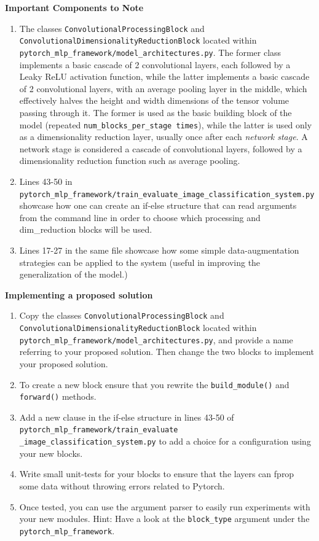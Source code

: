 \documentclass[11pt,]{article}
\begin{document}
\textbf{Important Components to Note}

\begin{enumerate}
    \item The classes \texttt{ConvolutionalProcessingBlock} and \texttt{ConvolutionalDimensionalityReductionBlock} located within \texttt{pytorch\_mlp\_framework/model\_architectures.py}. The former class implements a basic cascade of 2 convolutional layers, each followed by a Leaky ReLU activation function, while the latter implements a basic cascade of 2 convolutional layers, with an average pooling layer in the middle, which effectively halves the height and width dimensions of the tensor volume passing through it. The former is used as the basic building block of the model (repeated \texttt{num\_blocks\_per\_stage times}), while the latter is used only as a dimensionality reduction layer, usually once after each \emph{network stage}. A network stage is considered a cascade of convolutional layers, followed by a dimensionality reduction function such as average pooling. 
    \item Lines 43-50 in \texttt{pytorch\_mlp\_framework/train\_evaluate\_image\_classification\_system.py} showcase how one can create an if-else structure that can read arguments from the command line in order to choose which processing and dim\_reduction blocks will be used.
    \item Lines 17-27 in the same file showcase how some simple data-augmentation strategies can be applied to the system (useful in improving the generalization of the model.)
     
\end{enumerate}

\textbf{Implementing a proposed solution}

\begin{enumerate}
    \item Copy the classes \texttt{ConvolutionalProcessingBlock} and \texttt{ConvolutionalDimensionalityReductionBlock} located within \texttt{pytorch\_mlp\_framework/model\_architectures.py}, and provide a name referring to your proposed solution. Then change the two blocks to implement your proposed solution.
    \item To create a new block ensure that you rewrite the \texttt{build\_module()} and \texttt{forward()} methods.
    \item Add a new clause in the if-else structure in lines 43-50 of  \texttt{pytorch\_mlp\_framework/train\_evaluate} \texttt{\_image\_classification\_system.py} to add a choice for a configuration using your new blocks.
    \item Write small unit-tests for your blocks to ensure that the layers can fprop some data without throwing errors related to Pytorch.
    \item Once tested, you can use the argument parser to easily run experiments with your new modules. Hint: Have a look at the \texttt{block\_type} argument under the \texttt{pytorch\_mlp\_framework}.
\end{enumerate}
\end{document}
